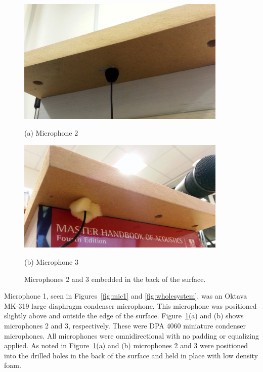\begin{figure}[t!]
\begin{minipage}[b]{1.0\linewidth}
  \centering
  \centerline{\includegraphics[width=10cm]{mic2}}%
  \centerline{(a) Microphone 2}\medskip
\end{minipage}
\begin{minipage}[b]{1.0\linewidth}
  \centering
  \centerline{\includegraphics[width=10cm]{mic3}}%
  \centerline{(b) Microphone 3}\medskip
\end{minipage}
\caption{Microphones 2 and 3 embedded in the back of the surface.}
\label{fig:mic23}
\end{figure}


Microphone 1, seen in Figures~\ref{fig:mic1} and \ref{fig:wholesystem}, was an Oktava MK-319 large diaphragm condenser microphone. This microphone was positioned slightly above and outside the edge of the surface. Figure~\ref{fig:mic23}(a) and (b) shows microphones 2 and 3, respectively. These were DPA 4060 miniature condenser microphones. All microphones were omnidirectional with no padding or equalizing applied. As noted in Figure~\ref{fig:mic23}(a) and (b) microphones 2 and 3 were positioned into the drilled holes in the back of the surface and held in place with low density foam.


